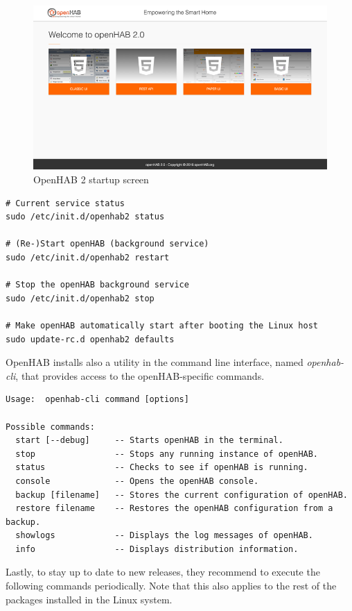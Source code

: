 \begin{figure}
    \centering
    \includegraphics[width=1\textwidth]{images/Chapter_07/openhab-startup.png}
    \caption{OpenHAB 2 startup screen}
    \label{fig:openhab-startup}
\end{figure}

\begin{lstlisting}[style=Consola]
# Current service status
sudo /etc/init.d/openhab2 status

# (Re-)Start openHAB (background service)
sudo /etc/init.d/openhab2 restart

# Stop the openHAB background service
sudo /etc/init.d/openhab2 stop

# Make openHAB automatically start after booting the Linux host
sudo update-rc.d openhab2 defaults
\end{lstlisting}

OpenHAB installs also a utility in the command line interface, named \textit{openhab-cli}, that provides access to the openHAB-specific
commands.

\begin{lstlisting}[style=Consola]
Usage:  openhab-cli command [options]

Possible commands:
  start [--debug]     -- Starts openHAB in the terminal.
  stop                -- Stops any running instance of openHAB.
  status              -- Checks to see if openHAB is running.
  console             -- Opens the openHAB console.
  backup [filename]   -- Stores the current configuration of openHAB.
  restore filename    -- Restores the openHAB configuration from a backup.
  showlogs            -- Displays the log messages of openHAB.
  info                -- Displays distribution information.
\end{lstlisting}

Lastly, to stay up to date to new releases, they recommend to execute the following commands periodically. Note that this also applies
to the rest of the packages installed in the Linux system.

